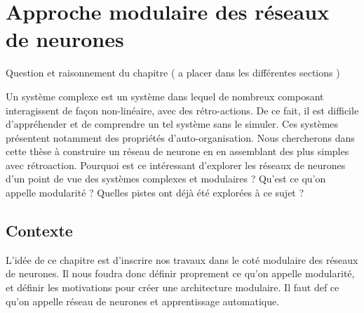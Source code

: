 \chapter{Approche modulaire des réseaux de neurones}
\graphicspath{{01-Modularite/}}

\minitoc


Question et raisonnement du chapitre ( a placer dans les différentes sections ) 

Un système complexe est un système dans lequel de nombreux composant interagissent de façon non-linéaire, avec des rétro-actions. De ce fait, il est difficile d'appréhender et de comprendre un tel système sans le simuler. Ces systèmes présentent notamment des propriétés d'auto-organisation.
Nous chercherons dans cette thèse à construire un réseau de neurone en en assemblant des plus simples avec rétroaction. 
Pourquoi est ce intéressant d'explorer les réseaux de neurones d'un point de vue des systèmes complexes et modulaires ? 
Qu'est ce qu'on appelle modularité ? 
Quelles pistes ont déjà été explorées à ce sujet ? 




\section{Contexte}

L'idée de ce chapitre est d'inscrire nos travaux dans le coté modulaire des réseaux de neurones. Il nous foudra donc définir proprement ce qu'on appelle modularité, et définir les motivations pour créer une architecture modulaire. Il faut def ce qu'on appelle réseau de neurones et apprentissage automatique. 

